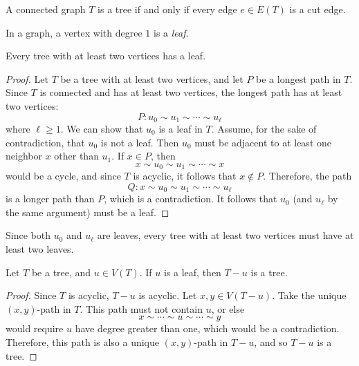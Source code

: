 \begin{thm}\label{tree-cute-edges}
    A connected graph $T$ is a tree if and only if every edge $e \in E(T)$ is a cut edge.
\end{thm}

\begin{defn}
    In a graph, a vertex with degree $1$ is a \emph{leaf}.
\end{defn}

\begin{thm}\label{tree-has-leaf}
    Every tree with at least two vertices has a leaf.
\end{thm}

\begin{proof}
    Let $T$ be a tree with at least two vertices, and let $P$ be a longest path in $T$. Since $T$ is connected and has at least two vertices, the longest path has at least two vertices:
    \[P: u_0 \sim u_1 \sim \cdots \sim u_{\ell}\] where $\ell \geq 1$. We can show that $u_0$ is a leaf in $T$. Assume, for the sake of contradiction, that $u_0$ is not a leaf. Then $u_0$ must be adjacent to at least one neighbor $x$ other than $u_1$. If $x \in P$, then
    \[x \sim u_0 \sim u_1 \sim \cdots \sim x\] would be a cycle, and since $T$ is acyclic, it follows that $x \notin P$. Therefore, the path
    \[Q: x \sim u_0 \sim u_1 \sim \cdots \sim u_{\ell}\] is a longer path than $P$, which is a contradiction. It follows that $u_0$ (and $u_{\ell}$ by the same argument) must be a leaf.
\end{proof}

\begin{rmk}
    Since both $u_0$ and $u_{\ell}$ are leaves, every tree with at least two vertices must have at least two leaves.
\end{rmk}

\begin{prop}\label{tree-minus-leaf}
    Let $T$ be a tree, and $u \in V(T)$. If $u$ is a leaf, then $T - u$ is a tree.
\end{prop}

\begin{proof}
    Since $T$ is acyclic, $T - u$ is acyclic. Let $x, y \in V(T - u)$. Take the unique $(x, y)$-path in $T$. This path must not contain $u$, or else
    \[x \sim \cdots \sim u \sim \cdots \sim y\] would require $u$ have degree greater than one, which would be a contradiction. Therefore, this path is also a unique $(x, y)$-path in $T - u$, and so $T - u$ is a tree.
\end{proof}

